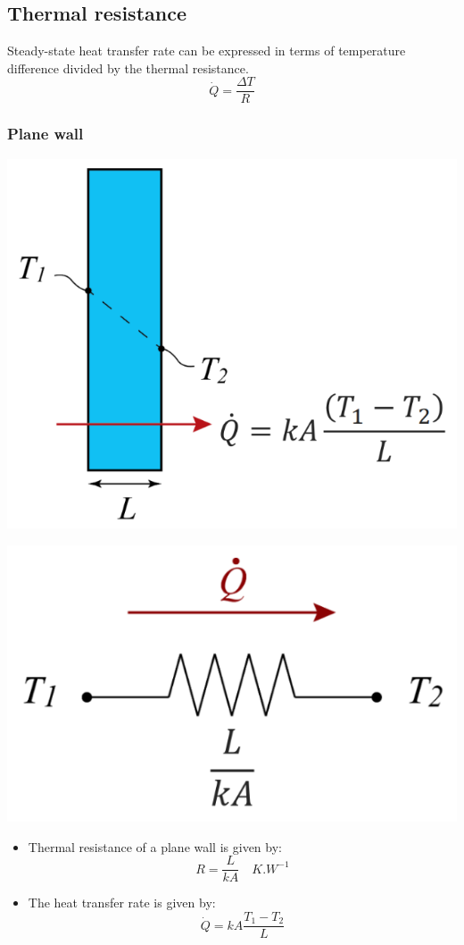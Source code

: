 \documentclass[11pt]{article}
\begin{document}
\subsection{Thermal resistance}
\label{sec:org76e3a4d}
Steady-state heat transfer rate can be expressed in terms of temperature difference divided by the thermal resistance.
\[\dot{Q} = \frac{\Delta T}{R}\]

\subsubsection{Plane wall}
\label{sec:orge8e06b2}
\begin{center}
\includegraphics[scale=0.8]{./images/thermal-resistance-plane-wall.png}
\end{center}
\begin{center}
\includegraphics[scale=0.8]{./images/thermal-resistance-plane-wall-electrical-analogy.png}
\end{center}
\begin{itemize}
\item Thermal resistance of a plane wall is given by:
\[R = \frac{L}{kA} \quad \unit{K.W^{-1}}\]
\item The heat transfer rate is given by:
\[\dot{Q} = kA \frac{T_1 - T_2}{L}\]
\end{itemize}
\end{document}
